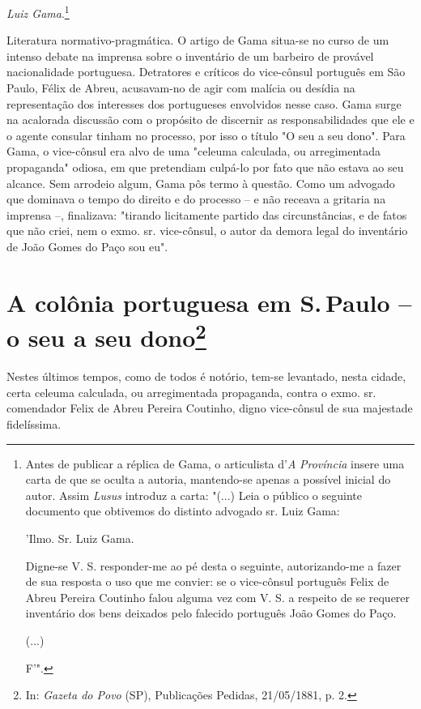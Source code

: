 \emph{Luiz Gama}.\footnote{Antes de publicar a réplica de Gama, o
  articulista d'\emph{A} \emph{Província} insere uma carta de que se
  oculta a autoria, mantendo-se apenas a possível inicial do autor.
  Assim \emph{Lusus} introduz a carta: "(...) Leia o público o seguinte
  documento que obtivemos do distinto advogado sr. Luiz Gama:

  'Ilmo. Sr. Luiz Gama.

  Digne-se V. S. responder-me ao pé desta o seguinte, autorizando-me a
  fazer de sua resposta o uso que me convier: se o vice-cônsul português
  Felix de Abreu Pereira Coutinho falou alguma vez com V. S. a respeito
  de se requerer inventário dos bens deixados pelo falecido português
  João Gomes do Paço.

  (...)

  F'".}

\pagebreak
\mbox{}\vfill
\thispagestyle{empty}

{\small\noindent
Literatura normativo-pragmática. O artigo de Gama situa-se no
curso de um intenso debate na imprensa sobre o inventário de um barbeiro
de provável nacionalidade portuguesa. Detratores e críticos do
vice-cônsul português em São Paulo, Félix de Abreu, acusavam-no de agir
com malícia ou desídia na representação dos interesses dos portugueses
envolvidos nesse caso. Gama surge na acalorada discussão com o propósito
de discernir as responsabilidades que ele e o agente consular tinham no
processo, por isso o título "O seu a seu dono". Para Gama, o vice-cônsul
era alvo de uma "celeuma calculada, ou arregimentada propaganda" odiosa,
em que pretendiam culpá-lo por fato que não estava ao seu alcance. Sem
arrodeio algum, Gama pôs termo à questão. Como um advogado que dominava
o tempo do direito e do processo -- e não receava a gritaria na imprensa
--, finalizava: "tirando licitamente partido das circunstâncias, e de
fatos que não criei, nem o exmo. sr. vice-cônsul, o autor da demora
legal do inventário de João Gomes do Paço sou eu". }

\chapter{A colônia portuguesa em S.\,Paulo -- o seu a seu
dono\footnote[*]{In: \emph{Gazeta do Povo} (SP), Publicações Pedidas,
  21/05/1881, p. 2.}}


Nestes últimos tempos, como de todos é notório, tem-se levantado, nesta
cidade, certa celeuma calculada, ou arregimentada propaganda, contra o
exmo. sr. comendador Felix de Abreu Pereira Coutinho, digno vice-cônsul
de sua majestade fidelíssima.


